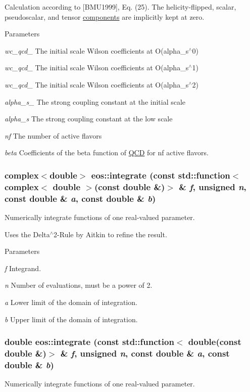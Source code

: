 Calculation according to \mbox{[}BMU1999\mbox{]}, Eq. (25). The helicity-\/flipped, scalar, pseudoscalar, and tensor \hyperlink{namespaceeos_1_1components}{components} are implicitly kept at zero.


\begin{DoxyParams}{Parameters}
\item[{\em wc\_\-qcd\_\-0}]The initial scale Wilson coefficients at O(alpha\_\-s$^\wedge$0) \item[{\em wc\_\-qcd\_\-1}]The initial scale Wilson coefficients at O(alpha\_\-s$^\wedge$1) \item[{\em wc\_\-qcd\_\-2}]The initial scale Wilson coefficients at O(alpha\_\-s$^\wedge$2) \item[{\em alpha\_\-s\_\-0}]The strong coupling constant at the initial scale \item[{\em alpha\_\-s}]The strong coupling constant at the low scale \item[{\em nf}]The number of active flavors \item[{\em beta}]Coefficients of the beta function of \hyperlink{classeos_1_1QCD}{QCD} for nf active flavors. \end{DoxyParams}
\hypertarget{namespaceeos_ac60718e2ad5504caf40d52f07a86607d}{
\subsubsection[{integrate}]{\setlength{\rightskip}{0pt plus 5cm}complex$<$double$>$ eos::integrate (const std::function$<$ complex$<$ double $>$(const double \&)$>$ \& {\em f}, \/  unsigned {\em n}, \/  const double \& {\em a}, \/  const double \& {\em b})}}
\label{namespaceeos_ac60718e2ad5504caf40d52f07a86607d}
Numerically integrate functions of one real-\/valued parameter.

Uses the Delta$^\wedge$2-\/Rule by Aitkin to refine the result.


\begin{DoxyParams}{Parameters}
\item[{\em f}]Integrand. \item[{\em n}]Number of evaluations, must be a power of 2. \item[{\em a}]Lower limit of the domain of integration. \item[{\em b}]Upper limit of the domain of integration. \end{DoxyParams}
\hypertarget{namespaceeos_ae905f169a81a2dd54d1116bc201ad41a}{
\subsubsection[{integrate}]{\setlength{\rightskip}{0pt plus 5cm}double eos::integrate (const std::function$<$ double(const double \&)$>$ \& {\em f}, \/  unsigned {\em n}, \/  const double \& {\em a}, \/  const double \& {\em b})}}
\label{namespaceeos_ae905f169a81a2dd54d1116bc201ad41a}
Numerically integrate functions of one real-\/valued parameter.

